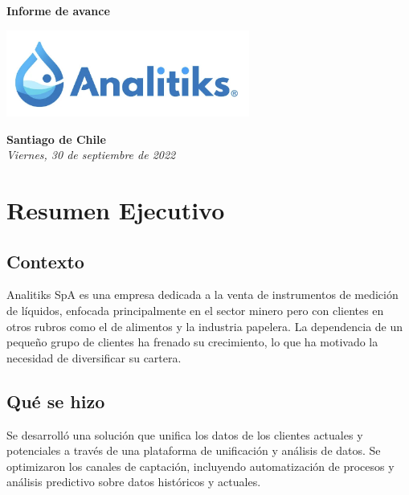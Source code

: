 \documentclass[12pt]{article}
\begin{document}
\begin{center}
    \vspace*{8cm}
    {\Huge \textbf{\sffamily Informe de avance}}\\[0.5em]
\end{center}

\begin{center}
    \includegraphics[width=8cm]{ANALITIKS.png}
\end{center}

\begin{center}
    \vspace{9cm}
    \textcolor{secondary}{\textbf{Santiago de Chile}}\\
    \textit{Viernes, 30 de septiembre de 2022}
    \vspace{1cm}
\end{center}


\newpage



\tableofcontents
\newpage

\section{Resumen Ejecutivo}

\subsection{Contexto}
Analitiks SpA es una empresa dedicada a la venta de instrumentos de medición de líquidos, enfocada principalmente en el sector minero pero con clientes en otros rubros como el de alimentos y la industria papelera. La dependencia de un pequeño grupo de clientes ha frenado su crecimiento, lo que ha motivado la necesidad de diversificar su cartera.

\subsection{Qué se hizo}
Se desarrolló una solución que unifica los datos de los clientes actuales y potenciales a través de una plataforma de unificación y análisis de datos. Se optimizaron los canales de captación, incluyendo automatización de procesos y análisis predictivo sobre datos históricos y actuales.
\end{document}
